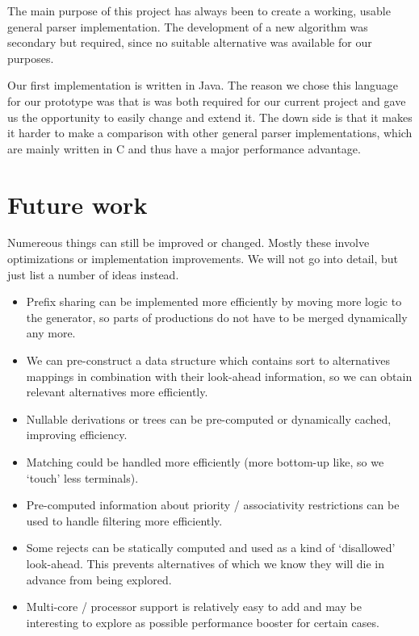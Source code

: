 \documentclass[a4paper,10pt]{article}
\begin{document}
The main purpose of this project has always been to create a working, usable general parser implementation. The development of a new algorithm was secondary but required, since no suitable alternative was available for our purposes.

Our first implementation is written in Java. The reason we chose this language for our prototype was that is was both required for our current project and gave us the opportunity to easily change and extend it. The down side is that it makes it harder to make a comparison with other general parser implementations, which are mainly written in C and thus have a major performance advantage.

\pagebreak
\section{Future work}

Numereous things can still be improved or changed. Mostly these involve optimizations or implementation improvements. We will not go into detail, but just list a number of ideas instead.

\begin{itemize}
 \setlength{\itemsep}{0pt}
 \setlength{\parskip}{0pt}
 \setlength{\parsep}{0pt}
 
 \item Prefix sharing can be implemented more efficiently by moving more logic to the generator, so parts of productions do not have to be merged dynamically any more.
 \item We can pre-construct a data structure which contains sort to alternatives mappings in combination with their look-ahead information, so we can obtain relevant alternatives more efficiently.
 \item Nullable derivations or trees can be pre-computed or dynamically cached, improving efficiency.
 \item Matching could be handled more efficiently (more bottom-up like, so we `touch' less terminals).
 \item Pre-computed information about priority / associativity restrictions can be used to handle filtering more efficiently.
 \item Some rejects can be statically computed and used as a kind of `disallowed' look-ahead. This prevents alternatives of which we know they will die in advance from being explored.
 \item Multi-core / processor support is relatively easy to add and may be interesting to explore as possible performance booster for certain cases.
\end{itemize}
\end{document}
